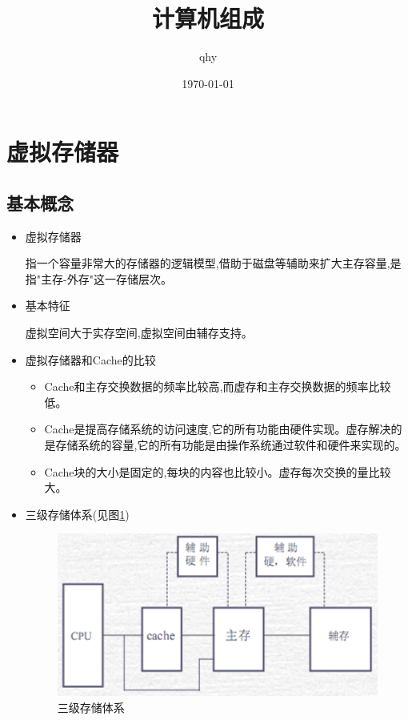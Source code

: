 \documentclass[UTF8,a4paper]{ctexart}%
\author{qhy}%
\date{\today}%
\title{计算机组成}%
\begin{document}
  \maketitle
  \tableofcontents
  \newpage
  \section{虚拟存储器}
      \subsection{基本概念}
          \begin{itemize}
            \item 虚拟存储器

            指一个容量非常大的存储器的逻辑模型,借助于磁盘等辅助来扩大主存容量,是指"主存-外存"这一存储层次。

            \item 基本特征

            虚拟空间大于实存空间,虚拟空间由辅存支持。

            \item 虚拟存储器和Cache的比较
                \begin{itemize}
                  \item Cache和主存交换数据的频率比较高,而虚存和主存交换数据的频率比较低。

                  \item Cache是提高存储系统的访问速度,它的所有功能由硬件实现。虚存解决的是存储系统的容量,它的所有功能是由操作系统通过软件和硬件来实现的。

                  \item Cache块的大小是固定的,每块的内容也比较小。虚存每次交换的量比较大。
                \end{itemize}
            \item 三级存储体系(见图\ref{fig1})
                \begin{figure}[!htp]
                  \centering
                  \includegraphics[scale=0.8]{assets/jisuanjizucheng2_14007.png}
                  \caption{三级存储体系}
                  \label{fig1}
                \end{figure}
                

\end{itemize}
\end{document}
